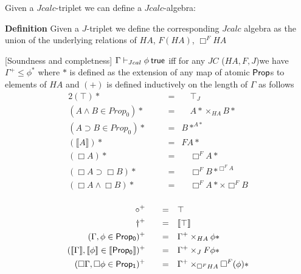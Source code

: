 			Given a $Jcalc$-triplet we can define a $Jcalc$-algebra:
			\begin{mdframed}
				\textbf{Definition}
				Given a $J$-triplet we define the corresponding $Jcalc$ algebra as the union of the underlying relations
				of   $HA$, $F(HA)$, $\Box^{F}HA$
			\end{mdframed}
			
				\begin{theorem}\label{thm:cmpha}[Soundness and completness]
				$\Gamma\vdash_{Jcal}\phi \true$ iff for any  $JC$ ($HA,F,J$)we have 
				$\Gamma^+\leq\phi^{*}$ where $*$ is  defined as 
				the extension of any map of atomic $\prop$s to elements of $HA$ and $(+)$ 
				is defined inductively on the length of $\Gamma$ as follows
				\begin{alignat*}{2}
					(\top)* &&\quad= & \quad\top_J\\
					(A\wedge B \in Prop_0)*  &&\quad = & \quad  A*\times_{HA}B*\\
					(A\supset B \in Prop_0)*  &&\quad = & B*^{A*}\\
					(\llbracket A\rrbracket)* && \quad = & FA*\\
					(\Box A)* &&\quad = & \quad\Box^F A* \\
					(\Box A\supset \Box B)*  &&\quad = & \quad\Box^F B*^{\Box^F A}\\
					(\Box A\wedge\Box B)*  &&\quad = & \quad\Box^F A*\times{\Box^F B}\\
				\end{alignat*}
				
				\begin{alignat*}{2}
				  \circ^+  &&\quad = & \quad\top\\
				  \dagger^+ &&\quad = & \quad\llbracket\top\rrbracket\\
				  (\Gamma,\phi\in \sf {Prop_0})^+&&\quad = &\quad
				  \Gamma^+\times_{HA}\phi* \\
				  (\llbracket \Gamma\rrbracket,\llbracket\phi\rrbracket \in {\sf \llbracket Prop_0\rrbracket})^+&&\quad = &\quad
				  \Gamma^+\times_{J}F\phi*\\
				  (\Box\Gamma, \Box\phi \in {\sf Prop_1})^+&&\quad = &\quad
				  \Gamma^+\times_{\Box^{F}HA}\Box^F (\phi)*\\
				\end{alignat*}
				\end{theorem}
